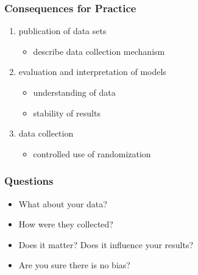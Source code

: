 \documentclass[bigger]{beamer}
\begin{document}
\begin{frame}
  \frametitle{Consequences for Practice}

  \begin{enumerate}
  \item publication of data sets
    \begin{itemize}
    \item describe data collection mechanism
    \end{itemize}
  \item evaluation and interpretation of models
    \begin{itemize}
    \item understanding of data 
    \item stability of results
    \end{itemize}
  \item data collection
    \begin{itemize}
    \item controlled use of randomization
    \end{itemize}
  \end{enumerate}
\end{frame}

\begin{frame}
  \frametitle{Questions}

  \begin{itemize}
  \item What about your data?
  \item How were they collected?
  \item Does it matter? Does it influence your results?
  \item Are you sure there is no bias?
  \end{itemize}

\end{frame}


\end{document}
